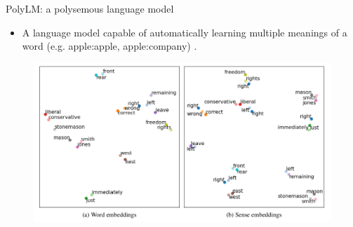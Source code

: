 \documentclass[handout]{beamer}
\begin{document}
\begin{frame}{PolyLM: a polysemous language model}
\begin{scriptsize}
\begin{itemize}
 \item A language model capable of automatically learning multiple meanings of a word (e.g. apple:apple, apple:company) \cite{ansell2021polylm}.
\end{itemize}
  \begin{figure}[h]
        	\includegraphics[scale = 0.3]{pics/senseembeddings.png}
        \end{figure}

\end{scriptsize}
\end{frame}
\end{document}
